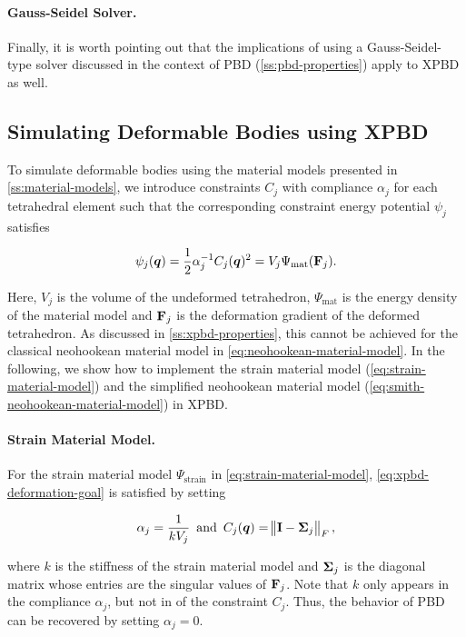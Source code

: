 \paragraph{Gauss-Seidel Solver.}
Finally, it is worth pointing out that the implications of using a Gauss-Seidel-type solver discussed in the context of PBD 
(\cref{ss:pbd-properties}) apply to XPBD as well.

\subsection{Simulating Deformable Bodies using XPBD}\label{ss:xpbd-deformable-bodies}
To simulate deformable bodies using the material models presented in \autoref{ss:material-models}, we introduce constraints $C_j$ with 
compliance $\alpha_j$ for each tetrahedral element such that the corresponding constraint energy 
potential $\psi_j$ satisfies

\begin{equation}\label{eq:xpbd-deformation-goal}
    \psi_j(\bm{q}) = \frac{1}{2}\alpha^{-1}_jC_j(\bm{q})^2 = V_j\Psi_{\text{mat}}(\mathbf{F}_j).
\end{equation}

\noindent Here, $V_j$ is the volume of the undeformed tetrahedron, $\Psi_{\text{mat}}$ is the energy density of the material 
model and $\mathbf{F}_j$ is the deformation gradient of the deformed tetrahedron. As discussed in \autoref{ss:xpbd-properties}, this 
cannot be achieved for the classical neohookean material model in \autoref{eq:neohookean-material-model}. In the following, we show 
how to implement the strain material model (\cref{eq:strain-material-model}) and the simplified neohookean material model 
(\cref{eq:smith-neohookean-material-model}) in XPBD.

\paragraph{Strain Material Model.}
For the strain material model $\Psi_{\text{strain}}$ in \autoref{eq:strain-material-model}, \autoref{eq:xpbd-deformation-goal} is 
satisfied by setting 

\[
    \alpha_j = \frac{1}{k V_j} \, \, \, \text{and} \, \, \, C_j(\bm{q}) = \norm{\mathbf{I} - \mathbf{\Sigma}_j}_F,
\]

\noindent where $k$ is the stiffness of the strain material model and $\mathbf{\Sigma}_j$ is the diagonal matrix whose entries 
are the singular values of $\mathbf{F}_j$. Note that $k$ only appears in the compliance $\alpha_j$, but not in of the constraint 
$C_j$. Thus, the behavior of PBD can be recovered by setting $\alpha_j = 0$.

